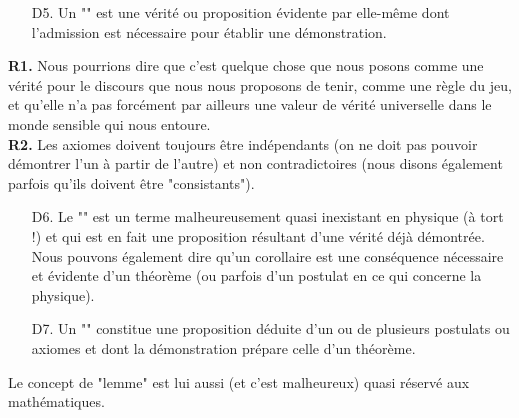 \begin{itemize}
	Le mot "principe" est utilis\'e avec abus dans les petites classes ou \'ecoles d'ing\'enieurs par les professeurs ne sachant (ce qui est très rare), ou ne voulant (plutôt fr\'equent), ou ne pouvant faute de temps (quasi exclusivement) d\'emontrer une relation.\\

	L'\'equivalent du postulat ou du principe en math\'ematiques est "l'axiome" que nous d\'efinissons ainsi:

	\item[D5.] Un "" est une v\'erit\'e ou proposition \'evidente par elle-même dont l'admission est n\'ecessaire pour \'etablir une d\'emonstration.\label{axiom} 
\end{itemize}

	\begin{tcolorbox}[title=Remarques,colframe=black,arc=10pt]
	\textbf{R1.} Nous pourrions dire que c'est quelque chose que nous posons comme une v\'erit\'e pour le discours que nous nous proposons de tenir, comme une règle du jeu, et qu'elle n'a pas forc\'ement par ailleurs une valeur de v\'erit\'e universelle dans le monde sensible qui nous entoure.\\

	\textbf{R2.} Les axiomes doivent toujours être ind\'ependants (on ne doit pas pouvoir d\'emontrer l'un à partir de l'autre) et non contradictoires (nous disons \'egalement parfois qu'ils doivent être "consistants").
	\end{tcolorbox}	
	
\begin{itemize}
	\item[D6.]  Le "" est un terme malheureusement quasi inexistant en physique (à tort !) et qui est en fait une proposition r\'esultant d'une v\'erit\'e d\'ejà d\'emontr\'ee. Nous pouvons \'egalement dire qu'un corollaire est une cons\'equence n\'ecessaire et \'evidente d'un th\'eorème (ou parfois d'un postulat en ce qui concerne la physique).

	\item[D7.] Un "" constitue une proposition d\'eduite d'un ou de plusieurs postulats ou axiomes et dont la d\'emonstration pr\'epare celle d'un th\'eorème.
\end{itemize}

	\begin{tcolorbox}[title=Remarque,colframe=black,arc=10pt]
	Le concept de "lemme" est lui aussi (et c'est malheureux) quasi r\'eserv\'e aux math\'ematiques.
	\end{tcolorbox}	

